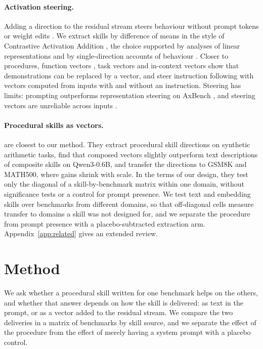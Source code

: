 \documentclass[11pt]{article}
\begin{document}
\paragraph{Activation steering.} Adding a direction to the residual stream steers behaviour without
prompt tokens or weight edits
\citep{subramani2022extracting,turner2023actadd,li2023iti,zou2023repe}. We extract skills by
difference of means in the style of Contrastive Activation Addition \citep{panickssery2024caa}, the
choice supported by analyses of linear representations
\citep{marks2024geometry,park2024linear,im2025steering} and by single-direction accounts of behaviour
\citep{arditi2024refusal}. Closer to procedures, function vectors \citep{todd2024function}, task
vectors \citep{hendel2023taskvectors} and in-context vectors \citep{liu2024icv} show that
demonstrations can be replaced by a vector, and \citet{stolfo2025instruction} steer instruction
following with vectors computed from inputs with and without an instruction. Steering has limits:
prompting outperforms representation steering on AxBench \citep{wu2025axbench}, and steering vectors
are unreliable across inputs \citep{tan2024reliability}.

\paragraph{Procedural skills as vectors.} \citet{jiang2026latent} are closest to our method. They
extract procedural skill directions on synthetic arithmetic tasks, find that composed vectors
slightly outperform text descriptions of composite skills on Qwen3-0.6B, and transfer the directions
to GSM8K and MATH500, where gains shrink with scale. In the terms of our design, they test only the
diagonal of a skill-by-benchmark matrix within one domain, without significance tests or a control
for prompt presence. We test text and embedding skills over benchmarks from different domains, so
that off-diagonal cells measure transfer to domains a skill was not designed for, and we separate the
procedure from prompt presence with a placebo-subtracted extraction arm.
Appendix~\ref{app:related} gives an extended review.

\section{Method}

We ask whether a procedural skill written for one benchmark helps on the others, and whether that
answer depends on how the skill is delivered: as text in the prompt, or as a vector added to the
residual stream. We compare the two deliveries in a matrix of benchmarks by skill source, and we
separate the effect of the procedure from the effect of merely having a system prompt with a placebo
control.
\end{document}
